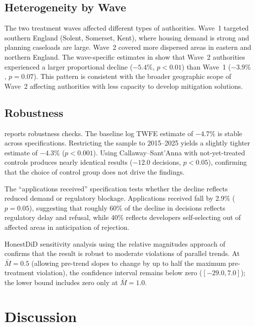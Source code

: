\documentclass[12pt]{article}
\begin{document}
\subsection{Heterogeneity by Wave}

The two treatment waves affected different types of authorities. Wave~1 targeted southern England (Solent, Somerset, Kent), where housing demand is strong and planning caseloads are large. Wave~2 covered more dispersed areas in eastern and northern England. The wave-specific estimates in  show that Wave~2 authorities experienced a larger proportional decline ($-5.4\%$, $p < 0.01$) than Wave~1 ($-3.9\%$, $p = 0.07$). This pattern is consistent with the broader geographic scope of Wave~2 affecting authorities with less capacity to develop mitigation solutions.

\subsection{Robustness}



 reports robustness checks. The baseline log TWFE estimate of $-4.7\%$ is stable across specifications. Restricting the sample to 2015--2025 yields a slightly tighter estimate of $-4.3\%$ ($p < 0.001$). Using Callaway--Sant'Anna with not-yet-treated controls produces nearly identical results ($-12.0$ decisions, $p < 0.05$), confirming that the choice of control group does not drive the findings.

The ``applications received'' specification tests whether the decline reflects reduced demand or regulatory blockage. Applications received fall by 2.9\% ($p = 0.05$), suggesting that roughly 60\% of the decline in decisions reflects regulatory delay and refusal, while 40\% reflects developers self-selecting out of affected areas in anticipation of rejection.

HonestDiD sensitivity analysis using the relative magnitudes approach of \citet{RambachanRoth2023} confirms that the result is robust to moderate violations of parallel trends. At $\bar{M} = 0.5$ (allowing pre-trend slopes to change by up to half the maximum pre-treatment violation), the confidence interval remains below zero ($[-29.0, 7.0]$); the lower bound includes zero only at $\bar{M} = 1.0$.

\section{Discussion}
\label{sec:discussion}
\end{document}
